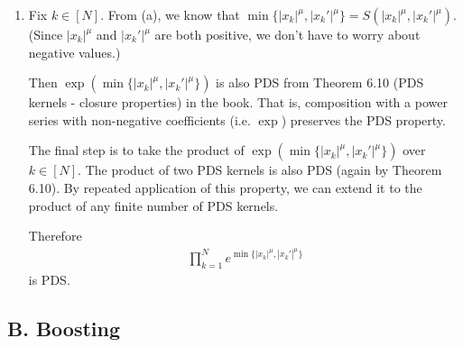 \begin{enumerate}
\begin{enumerate}
    \item Fix $k \in [N]$.
    From (a), we know that 
    $\min \{|x_k|^\mu, |x_k'|^\mu \}
    = S(|x_k|^\mu, |x_k'|^\mu)$.
    (Since $|x_k|^\mu$ and $|x_k'|^\mu$ 
    are both positive, we don't
    have to worry about negative values.)

    Then $\exp(\min \{|x_k|^\mu, |x_k'|^\mu \})$
    is also PDS
    from Theorem 6.10 (PDS kernels - closure properties)
    in the book.
    That is, composition with a power series
    with non-negative coefficients (i.e. $\exp$)
    preserves the PDS property.

    The final step is to take the product of
    $\exp(\min \{|x_k|^\mu, |x_k'|^\mu \})$
    over $k \in [N]$.
    The product of two PDS kernels
    is also PDS (again by Theorem 6.10).
    By repeated application of this property,
    we can extend it to the product of
    any finite number of PDS kernels.

    Therefore
    \begin{align}
        \prod_{k=1}^N
        e^{\min \{|x_k|^\mu, |x_k'|^\mu \}}
        \nonumber
    \end{align}
    is PDS.
    \end{enumerate}
\end{enumerate}

\subsection*{B. Boosting}

